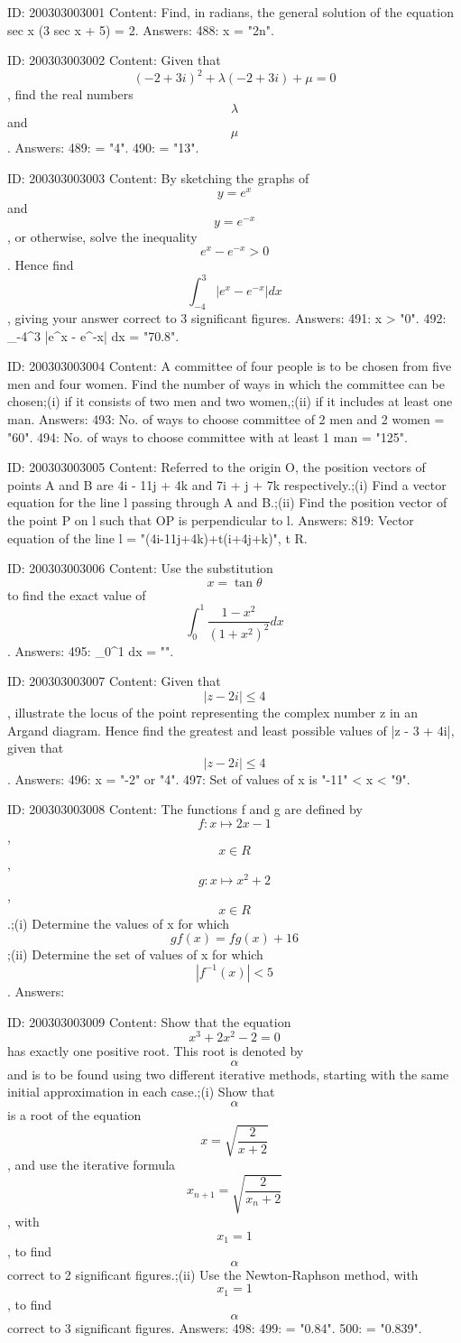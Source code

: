 \documentclass{article}
\begin{document}
ID: 200303003001
Content:
Find, in radians, the general solution of the equation sec x (3 sec x + 5) = 2. Answers:
488: x = "2n\pi\pm{}\pi".

ID: 200303003002
Content:
Given that  $$(  - 2 + 3i )^2  + \lambda (  - 2 + 3i ) + \mu  = 0$$, find the real numbers  $$\lambda $$ and  $$\mu $$. Answers:
489: \lambda = "4".
490: \mu = "13".

ID: 200303003003
Content:
By sketching the graphs of  $$y = e^x $$ and  $$y = e^{-x} $$, or otherwise, solve the inequality  $$e^x  - e^{- x} > 0$$. Hence find  $$\int_{-4}^{3} |e^x  - e^{- x}|dx $$, giving your answer correct to 3 significant figures. Answers:
491: x > "0".
492: \int_{-4}^3 |e^x - e^{-x}| dx = "70.8".

ID: 200303003004
Content:
A committee of four people is to be chosen from five men and four women. Find the number of ways in which the committee can be chosen;(i) if it consists of two men and two women,;(ii) if it includes at least one man. Answers:
493: No. of ways to choose committee of 2 men and 2 women = "60".
494: No. of ways to choose committee with at least 1 man = "125".

ID: 200303003005
Content:
Referred to the origin O, the position vectors of points A and B are 4i - 11j + 4k and 7i + j + 7k respectively.;(i) Find a vector equation for the line l passing through A and B.;(ii) Find the position vector of the point P on l such that OP is perpendicular to l. Answers:
819: Vector equation of the line l = "(4i-11j+4k)+t(i+4j+k)", t \in R.

ID: 200303003006
Content:
Use the substitution  $$x = \tan \theta $$ to find the exact value of  $$\int_0^1 \frac{1-x^2}{( 1 + x^2  )^2} dx $$. Answers:
495: \int_0^1  dx = "".

ID: 200303003007
Content:
Given that  $$| z - 2i | \le 4$$, illustrate the locus of the point representing the complex number z in an Argand diagram. Hence find the greatest and least possible values of |z - 3 + 4i|, given that  $$| z - 2i | \le 4$$. Answers:
496: x = "-2" or "4".
497: Set of values of x is "-11" < x < "9".

ID: 200303003008
Content:
The functions f and g are defined by  $$f:x \mapsto 2x - 1$$,  $$x \in R$$,  $$g:x \mapsto x^2  + 2$$,  $$x \in R$$.;(i) Determine the values of x for which $$gf(x) = fg(x) + 16$$;(ii) Determine the set of values of x for which  $$| f^{-1}( x ) | < 5$$. Answers:

ID: 200303003009
Content:
Show that the equation  $$x^3  + 2x^2  - 2 = 0$$ has exactly one positive root. This root is denoted by  $$\alpha $$ and is to be found using two different iterative methods, starting with the same initial approximation in each case.;(i) Show that  $$\alpha $$ is a root of the equation  $$x = \sqrt {\frac{2}{x + 2}} $$, and use the iterative formula  $$x_{n + 1}  = \sqrt{\frac{2}{x_n  + 2}} $$, with  $$x_1  = 1$$, to find  $$\alpha $$ correct to 2 significant figures.;(ii) Use the Newton-Raphson method, with  $$x_1  = 1$$, to find  $$\alpha $$ correct to 3 significant figures. Answers:
498: 
499: \alpha = "0.84".
500: \alpha = "0.839".
\end{document}
